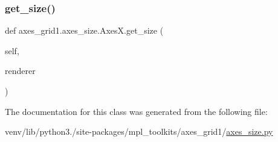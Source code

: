\subsubsection{\texorpdfstring{get\+\_\+size()}{get\_size()}}
{\footnotesize\ttfamily def axes\+\_\+grid1.\+axes\+\_\+size.\+Axes\+X.\+get\+\_\+size (\begin{DoxyParamCaption}\item[{}]{self,  }\item[{}]{renderer }\end{DoxyParamCaption})}



The documentation for this class was generated from the following file\+:\begin{DoxyCompactItemize}
\item 
venv/lib/python3./site-\/packages/mpl\+\_\+toolkits/axes\+\_\+grid1/\hyperlink{_2axes__size_8py}{axes\+\_\+size.\+py}\end{DoxyCompactItemize}
